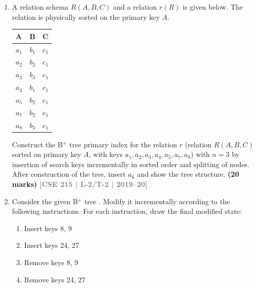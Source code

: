 \documentclass[12pt]{article}
\newcommand{\btnode}[5]{%
    \node (#1) at #2 [minimum width=1.4cm, minimum height=0.8cm, inner sep=0pt] {};
    \begin{scope}[shift={(#1.south west)}]
        \draw[line width=0.7pt] (0,0) rectangle (1.4,0.8);
        \draw[line width=0.5pt] (0,0.4) -- (1.4,0.4);
        \draw[line width=0.5pt] (0.466,0.4) -- (0.466,0.8);
        \draw[line width=0.5pt] (0.933,0.4) -- (0.933,0.8);
        \draw[line width=0.5pt] (0.35,0) -- (0.35,0.4);
        \draw[line width=0.5pt] (0.70,0) -- (0.70,0.4);
        \draw[line width=0.5pt] (1.05,0) -- (1.05,0.4);
        \node[font=\sffamily\small\bfseries] at (0.233, 0.6) {#3};
        \node[font=\sffamily\small\bfseries] at (0.700, 0.6) {#4};
        \node[font=\sffamily\small\bfseries] at (1.166, 0.6) {#5};
    \end{scope}
    \coordinate (#1-p0) at ($(#1.south west) + (0.175, 0.2)$);
    \coordinate (#1-p1) at ($(#1.south west) + (0.525, 0.2)$);
    \coordinate (#1-p2) at ($(#1.south west) + (0.875, 0.2)$);
    \coordinate (#1-p3) at ($(#1.south west) + (1.225, 0.2)$);
    \coordinate (#1-top) at ($(#1.north west) + (0.7, 0)$);
    \coordinate (#1-leftbtm) at ($(#1.south west) + (0, 0.2)$);
}
\newcommand{\yr}[1]{\hfill\textcolor{gray}{\small\textbf{[#1]}}}
\newcommand{\mk}[1]{\textcolor{orange!70!black}{\small\textbf{(#1 marks)}}}
\begin{document}
\begin{enumerate}
\item A relation schema $R(A, B, C)$ and a relation $r(R)$ is given below. The relation is physically sorted on the primary key $A$.
\medskip
\begin{center}
\small
\begin{tabular}{lll}
\toprule
\textbf{A} & \textbf{B} & \textbf{C}\\
\midrule
$a_1$ & $b_1$ & $c_1$\\
$a_2$ & $b_2$ & $c_1$\\
$a_3$ & $b_3$ & $c_1$\\
$a_4$ & $b_1$ & $c_1$\\
$a_5$ & $b_2$ & $c_1$\\
$a_7$ & $b_2$ & $c_1$\\
$a_8$ & $b_3$ & $c_1$\\
\bottomrule
\end{tabular}
\end{center}
Construct the B$^+$ tree primary index for the relation $r$  (relation $R(A,B,C)$ sorted on primary key $A$, with keys $a_1, a_2, a_3, a_4, a_5, a_7, a_8$) with $n = 3$ by insertion of search keys incrementally in sorted order and splitting of nodes. After construction of the tree, insert $a_6$ and show the tree structure.
\mk{20} \yr{CSE 215 | L-2/T-2 | 2019--20}


\item Consider the given B$^+$ tree . Modify it incrementally according to the following instructions. For each instruction, draw the final modified state:
\begin{enumerate}
  \item Insert keys 8, 9
  \item Insert keys 24, 27
  \item Remove keys 8, 9
  \item Remove keys 24, 27
\end{enumerate}

\begin{center}
  
\end{center}
\end{enumerate}
\end{document}
